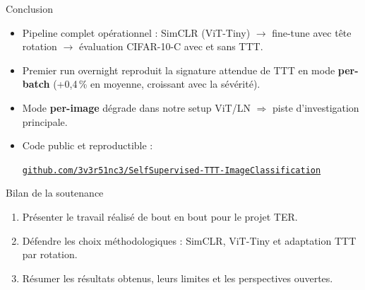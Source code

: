 \documentclass[10pt,aspectratio=169]{beamer}
\newcommand{\code}[1]{\texttt{\small #1}}
\begin{document}
\begin{frame}{Conclusion}
  \begin{itemize}
    \item Pipeline complet \alert{opérationnel} : SimCLR (ViT-Tiny) $\to$ fine-tune avec tête rotation $\to$ évaluation CIFAR-10-C avec et sans TTT.
    \item Premier run overnight reproduit la signature attendue de TTT en mode \textbf{per-batch} (+0,4\,\% en moyenne, croissant avec la sévérité).
    \item Mode \textbf{per-image} dégrade dans notre setup ViT/LN $\Rightarrow$ piste d'investigation principale.
    \item Code public et reproductible :
    \begin{center}\small
      \href{https://github.com/3v3r51nc3/SelfSupervised-TTT-ImageClassification}{\code{github.com/3v3r51nc3/SelfSupervised-TTT-ImageClassification}}
    \end{center}
  \end{itemize}

  \vspace{0.6em}
  \begin{block}{Bilan de la soutenance}
    \begin{enumerate}\small
      \item Présenter le travail réalisé de bout en bout pour le projet TER.
      \item Défendre les choix méthodologiques : SimCLR, ViT-Tiny et adaptation TTT par rotation.
      \item Résumer les résultats obtenus, leurs limites et les perspectives ouvertes.
    \end{enumerate}
  \end{block}
\end{frame}
\end{document}
